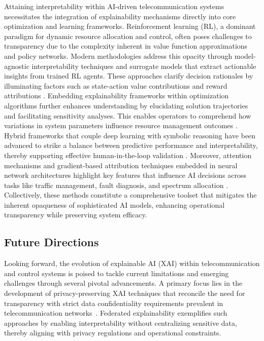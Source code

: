 \documentclass[sigconf]{acmart}
\begin{document}
Attaining interpretability within AI-driven telecommunication systems necessitates the integration of explainability mechanisms directly into core optimization and learning frameworks. Reinforcement learning (RL), a dominant paradigm for dynamic resource allocation and control, often poses challenges to transparency due to the complexity inherent in value function approximations and policy networks. Modern methodologies address this opacity through model-agnostic interpretability techniques and surrogate models that extract actionable insights from trained RL agents. These approaches clarify decision rationales by illuminating factors such as state-action value contributions and reward attributions \cite{ref3,ref5}. Embedding explainability frameworks within optimization algorithms further enhances understanding by elucidating solution trajectories and facilitating sensitivity analyses. This enables operators to comprehend how variations in system parameters influence resource management outcomes \cite{ref8,ref9}. Hybrid frameworks that couple deep learning with symbolic reasoning have been advanced to strike a balance between predictive performance and interpretability, thereby supporting effective human-in-the-loop validation \cite{ref12}. Moreover, attention mechanisms and gradient-based attribution techniques embedded in neural network architectures highlight key features that influence AI decisions across tasks like traffic management, fault diagnosis, and spectrum allocation \cite{ref14}. Collectively, these methods constitute a comprehensive toolset that mitigates the inherent opaqueness of sophisticated AI models, enhancing operational transparency while preserving system efficacy.

\subsection{Future Directions}

Looking forward, the evolution of explainable AI (XAI) within telecommunication and control systems is poised to tackle current limitations and emerging challenges through several pivotal advancements. A primary focus lies in the development of privacy-preserving XAI techniques that reconcile the need for transparency with strict data confidentiality requirements prevalent in telecommunication networks~\cite{ref48}. Federated explainability exemplifies such approaches by enabling interpretability without centralizing sensitive data, thereby aligning with privacy regulations and operational constraints.
\end{document}
